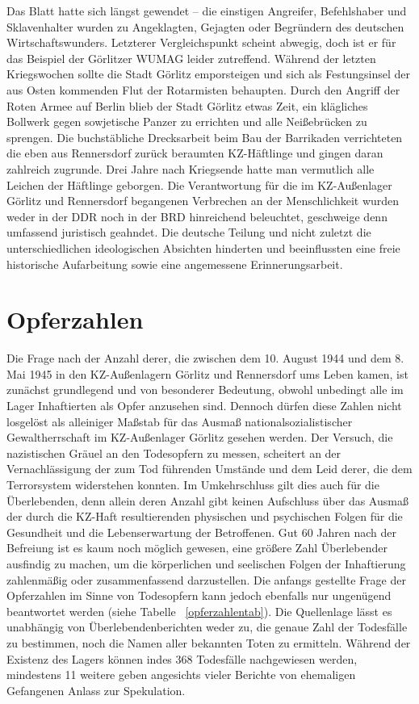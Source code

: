 \documentclass[a4paper,12pt,ngerman,
]{nisebook}
\begin{document}
Das Blatt hatte sich längst gewendet -- die einstigen Angreifer, Befehlshaber und Sklavenhalter wurden zu Angeklagten, Gejagten oder Begründern des deutschen Wirtschaftswunders. Letzt\-er\-er Vergleichspunkt scheint abwegig, doch ist er für das Beispiel der Görlitzer WUMAG leider zutreffend.
Während der letzten Kriegswochen sollte die Stadt Görlitz emporsteigen und sich als Festungsinsel der aus Osten kommenden Flut der Rotarmisten behaupten. Durch den Angriff der Roten Armee auf Berlin blieb der Stadt Görlitz etwas Zeit, ein klägliches Bollwerk gegen sowjetische Panzer zu errichten und alle Neißebrücken zu sprengen. Die buchstäbliche Drecksarbeit beim Bau der Barrikaden verrichteten die eben aus Rennersdorf zurück beraumten KZ-Häftlinge und gingen daran zahlreich zugrunde.
Drei Jahre nach Kriegsende hatte man vermutlich alle Leichen der Häftlinge geborgen. Die Verantwortung für die im KZ-Außenlager Görlitz und Rennersdorf begangenen Verbrechen an der Menschlichkeit wurden weder in der DDR noch in der BRD hinreichend beleuchtet, geschweige denn umfassend juristisch geahndet. Die deutsche Teilung und nicht zuletzt die unterschiedlichen ideologischen Absichten hinderten und beeinflussten eine freie historische Aufarbeitung sowie eine angemessene Erinnerungsarbeit.






\section{Opferzahlen}
Die Frage nach der Anzahl derer, die zwischen dem 10. August 1944 und dem 8. Mai 1945 in den KZ-Außenlagern Görlitz und Rennersdorf ums Leben kamen, ist zunächst grundlegend und von besonderer Bedeutung, obwohl unbedingt alle im Lager Inhaftierten als Opfer anzusehen sind. 
Dennoch dürfen diese Zahlen nicht losgelöst als alleiniger Maßstab für das Ausmaß nationalsozialistischer Gewaltherrschaft im KZ-Außenlager Görlitz gesehen werden. Der Versuch, die nazistischen Gräuel an den Todesopfern zu messen, scheitert an der Vernachlässigung der zum Tod führenden Umstände und dem Leid derer, die dem Terrorsystem widerstehen konnten. 
Im Umkehrschluss gilt dies auch für die Überlebenden, denn allein deren Anzahl gibt keinen Aufschluss über das Ausmaß der durch die KZ-Haft resultierenden physischen und psychischen Folgen für die Gesundheit und die Lebenserwartung der Betroffenen.
Gut 60 Jahren nach der Befreiung ist es kaum noch möglich gewesen, eine größere Zahl Überlebender ausfindig zu machen, um die körperlichen und seelischen Folgen der Inhaftierung zahlenmäßig oder zusammenfassend darzustellen.
\newline
Die anfangs gestellte Frage der Opferzahlen im Sinne von Todesopfern kann jedoch ebenfalls nur ungenügend beantwortet werden (siehe Tabelle ~\ref{opferzahlentab}). Die Quellenlage lässt es unabhängig von Überlebendenberichten weder zu, die genaue Zahl der Todesfälle zu bestimmen, noch die Namen aller bekannten Toten zu ermitteln. Während der Existenz des Lagers können indes 368 Todesfälle nachgewiesen werden, mindestens 11 weitere geben angesichts vieler Berichte von ehemaligen Gefangenen Anlass zur Spekulation. 
\end{document}
